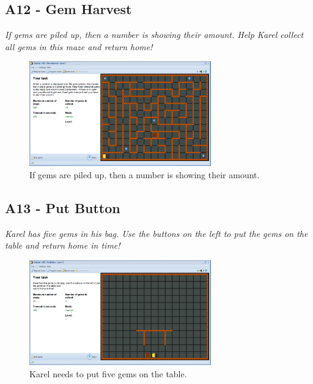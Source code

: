 \documentclass[article,A4,12pt]{llncs}
\begin{document}
\subsection{A12 - Gem Harvest}

{\em If gems are piled up, then a number is showing their amount. 
Help Karel collect all gems in this maze and return home!}\\[-7mm]

\begin{figure}[!ht]
\begin{center}
\includegraphics[width=0.7\textwidth]{img/a12.png}
\end{center}
\vspace{-4mm}
\caption{If gems are piled up, then a number is showing their amount.}
\label{fig:a12}
\vspace{-4mm}
\end{figure}
\noindent


\subsection{A13 - Put Button}

{\em Karel has five gems in his bag. Use the buttons on the left to put the gems on the table and 
return home in time!}\\[-7mm]

\begin{figure}[!ht]
\begin{center}
\includegraphics[width=0.7\textwidth]{img/a13.png}
\end{center}
\vspace{-4mm}
\caption{Karel needs to put five gems on the table.}
\label{fig:a13}
\vspace{-4mm}
\end{figure}
\noindent
\newpage
\end{document}
